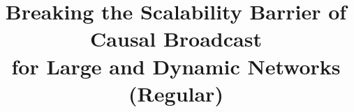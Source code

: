 \documentclass{IEEEtran}
\begin{document}
\title{Breaking the Scalability Barrier of Causal Broadcast\\for Large
  and Dynamic Networks (Regular)}

\newcommand{\affLSNN}{L2SN, University of Nantes\\
  2 rue de la Houssini{\`e}re\\
  BP 92208, 44322 Nantes Cedex 3, France\\
  \url{first.last@univ-nantes.fr}}






\maketitle










% 


  
\end{document}
